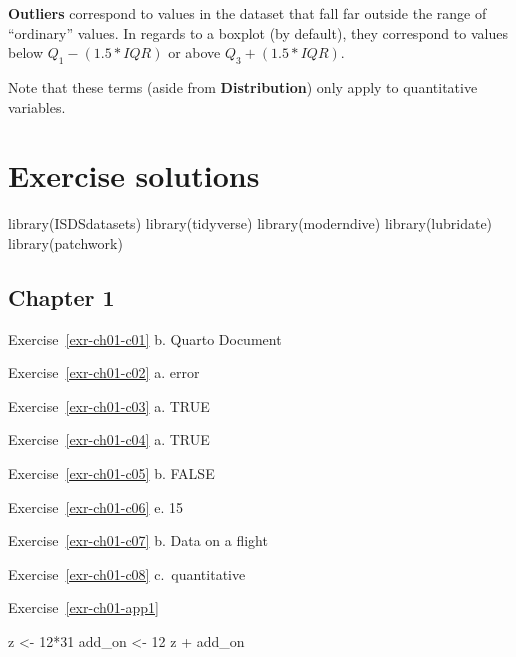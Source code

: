 \documentclass[
  letterpaper,
  DIV=11,
  numbers=noendperiod]{scrreprt}
\newenvironment{Shaded}{\begin{snugshade}}{\end{snugshade}}
\newcommand{\DecValTok}[1]{\textcolor[rgb]{0.68,0.00,0.00}{#1}}
\newcommand{\FunctionTok}[1]{\textcolor[rgb]{0.28,0.35,0.67}{#1}}
\newcommand{\NormalTok}[1]{\textcolor[rgb]{0.00,0.23,0.31}{#1}}
\newcommand{\OtherTok}[1]{\textcolor[rgb]{0.00,0.23,0.31}{#1}}
\newcommand{\SpecialCharTok}[1]{\textcolor[rgb]{0.37,0.37,0.37}{#1}}
\theoremstyle{definition}
\theoremstyle{remark}
\begin{document}
\textbf{Outliers} correspond to values in the dataset that fall far
outside the range of ``ordinary'' values. In regards to a boxplot (by
default), they correspond to values below \(Q_1 - (1.5 * IQR)\) or above
\(Q_3 + (1.5 * IQR)\).

Note that these terms (aside from \textbf{Distribution}) only apply to
quantitative variables.

\hypertarget{sec-exr-sol}{%
\chapter{Exercise solutions}\label{sec-exr-sol}}

\begin{Shaded}
\begin{Highlighting}[]
\FunctionTok{library}\NormalTok{(ISDSdatasets)}
\FunctionTok{library}\NormalTok{(tidyverse)}
\FunctionTok{library}\NormalTok{(moderndive)}
\FunctionTok{library}\NormalTok{(lubridate)}
\FunctionTok{library}\NormalTok{(patchwork)}
\end{Highlighting}
\end{Shaded}

\hypertarget{sec-ex01-sol}{%
\section{Chapter 1}\label{sec-ex01-sol}}

Exercise~\ref{exr-ch01-c01} b. Quarto Document

Exercise~\ref{exr-ch01-c02} a. error

Exercise~\ref{exr-ch01-c03} a. TRUE

Exercise~\ref{exr-ch01-c04} a. TRUE

Exercise~\ref{exr-ch01-c05} b. FALSE

Exercise~\ref{exr-ch01-c06} e. 15

Exercise~\ref{exr-ch01-c07} b. Data on a flight

Exercise~\ref{exr-ch01-c08} c.~quantitative

Exercise~\ref{exr-ch01-app1}

\begin{Shaded}
\begin{Highlighting}[]
\NormalTok{z }\OtherTok{\textless{}{-}} \DecValTok{12}\SpecialCharTok{*}\DecValTok{31}
\NormalTok{add\_on }\OtherTok{\textless{}{-}} \DecValTok{12}
\NormalTok{z }\SpecialCharTok{+}\NormalTok{ add\_on}
\end{Highlighting}
\end{Shaded}
\end{document}
